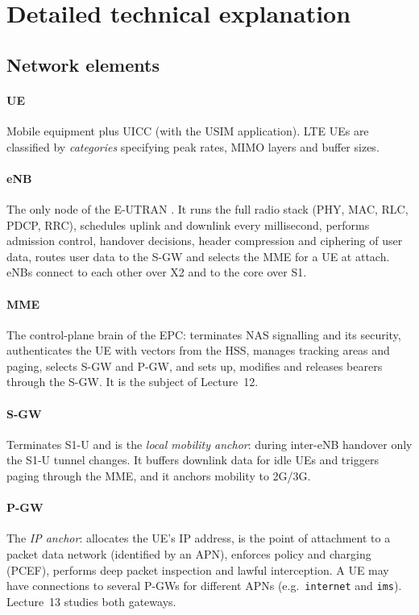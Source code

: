 \documentclass[11pt,a4paper]{article}
\begin{document}
\section{Detailed technical explanation}

\subsection{Network elements}
\paragraph{UE} Mobile equipment plus UICC (with the USIM application). LTE UEs are classified
by \emph{categories} specifying peak rates, MIMO layers and buffer sizes.

\paragraph{eNB} The only node of the E-UTRAN \cite{ts36300}. It runs the full radio stack
(PHY, MAC, RLC, PDCP, RRC), schedules uplink and downlink every millisecond, performs admission
control, handover decisions, header compression and ciphering of user data, routes user data to
the S-GW and selects the MME for a UE at attach. eNBs connect to each other over X2 and to the
core over S1.

\paragraph{MME} The control-plane brain of the EPC: terminates NAS signalling and its security,
authenticates the UE with vectors from the HSS, manages tracking areas and paging, selects
S-GW and P-GW, and sets up, modifies and releases bearers through the S-GW. It is the subject of
Lecture~12.

\paragraph{S-GW} Terminates S1-U and is the \emph{local mobility anchor}: during inter-eNB
handover only the S1-U tunnel changes. It buffers downlink data for idle UEs and triggers paging
through the MME, and it anchors mobility to 2G/3G.

\paragraph{P-GW} The \emph{IP anchor}: allocates the UE's IP address, is the point of attachment
to a packet data network (identified by an APN), enforces policy and charging (PCEF), performs
deep packet inspection and lawful interception. A UE may have connections to several P-GWs for
different APNs (e.g.\ \texttt{internet} and \texttt{ims}). Lecture~13 studies both gateways.
\end{document}

